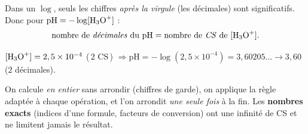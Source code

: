 \documentclass[11pt,a4paper]{article}
\begin{document}
\begin{cle}[logarithme et pH]
Dans un $\log$, seuls les chiffres \emph{après la virgule} (les décimales) sont significatifs. Donc
pour $\mathrm{pH}=-\log[\ce{H3O+}]$ :
\[ \text{nombre de \emph{décimales} du pH} = \text{nombre de \emph{CS} de }[\ce{H3O+}]. \]
\end{cle}

\begin{exemplebox}
$[\ce{H3O+}]=2,5\times10^{-4}$ (\,$2$ CS\,) $\Rightarrow \mathrm{pH}=-\log(2,5\times10^{-4})=3,60205\ldots
\to \boxed{3,60}$ ($2$ décimales).
\end{exemplebox}

\begin{remarque}
On calcule \emph{en entier} sans arrondir (chiffres de garde), on applique la règle adaptée à chaque
opération, et l'on arrondit \emph{une seule fois} à la fin. Les \textbf{nombres exacts} (indices d'une
formule, facteurs de conversion) ont une infinité de CS et ne limitent jamais le résultat.
\end{remarque}
\end{document}

